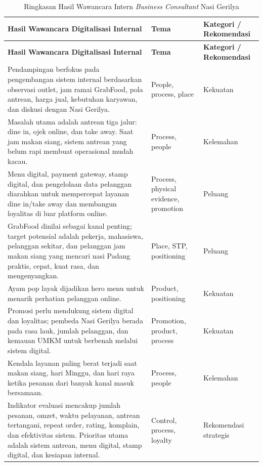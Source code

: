 \begingroup
    \scriptsize
    \begin{xltabular}{\textwidth}{|Y|Z{2.75cm}|Z{2.25cm}|}
        \caption{Ringkasan Hasil Wawancara Intern \textit{Business Consultant} Nasi Gerilya}
        \label{tab:koding-business-consultant-bab4}\\
        \toprule
        \textbf{Hasil Wawancara Digitalisasi Internal} & \textbf{Tema} & \textbf{Kategori / Rekomendasi} \\ \hline
        \midrule
        \endfirsthead
        \toprule
        \textbf{Hasil Wawancara Digitalisasi Internal} & \textbf{Tema} & \textbf{Kategori / Rekomendasi} \\ \hline
        \midrule
        \endhead
        \endfoot
        \bottomrule
        \endlastfoot
        Pendampingan berfokus pada pengembangan sistem internal berdasarkan observasi outlet, jam ramai GrabFood, pola antrean, harga jual, kebutuhan karyawan, dan diskusi dengan Nasi Gerilya. & People, process, place & Kekuatan \\ \hline
        Masalah utama adalah antrean tiga jalur: dine in, ojek online, dan take away. Saat jam makan siang, sistem antrean yang belum rapi membuat operasional mudah kacau. & Process, people & Kelemahan \\ \hline
        Menu digital, payment gateway, stamp digital, dan pengelolaan data pelanggan diarahkan untuk mempercepat layanan dine in/take away dan membangun loyalitas di luar platform online. & Process, physical evidence, promotion & Peluang \\ \hline
        GrabFood dinilai sebagai kanal penting; target potensial adalah pekerja, mahasiswa, pelanggan sekitar, dan pelanggan jam makan siang yang mencari nasi Padang praktis, cepat, kuat rasa, dan mengenyangkan. & Place, STP, positioning & Peluang \\ \hline
        Ayam pop layak dijadikan hero menu untuk menarik perhatian pelanggan online. & Product, positioning & Kekuatan \\ \hline
        Promosi perlu mendukung sistem digital dan loyalitas; pembeda Nasi Gerilya berada pada rasa lauk, jumlah pelanggan, dan kemauan UMKM untuk berbenah melalui sistem digital. & Promotion, product, process & Kekuatan \\ \hline
        Kendala layanan paling berat terjadi saat makan siang, hari Minggu, dan hari raya ketika pesanan dari banyak kanal masuk bersamaan. & Process, people & Kelemahan \\ \hline
        Indikator evaluasi mencakup jumlah pesanan, omzet, waktu pelayanan, antrean tertangani, repeat order, rating, komplain, dan efektivitas sistem. Prioritas utama adalah sistem antrean, menu digital, stamp digital, dan kesiapan internal. & Control, process, loyalty & Rekomendasi strategis \\ \hline
    \end{xltabular}
\endgroup

